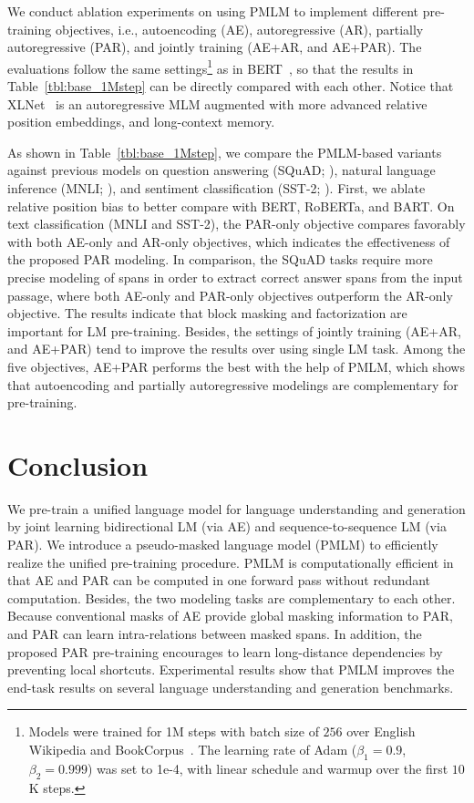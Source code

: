 \documentclass{article}
\newcommand\pmlmfull{pseudo-masked language model}
\newcommand\pmlm{\textsc{PMLM}}
\begin{document}
We conduct ablation experiments on using \pmlm{} to implement different pre-training objectives, i.e., autoencoding (AE), autoregressive (AR), partially autoregressive (PAR), and jointly training (AE+AR, and AE+PAR).
The evaluations follow the same settings\footnote{Models were trained for 1M steps with batch size of $256$ over English Wikipedia and BookCorpus~\cite{bookcorpus}. The learning rate of Adam ($\beta_1=0.9$, $\beta_2=0.999$) was set to 1e-4, with linear schedule and warmup over the first $10$K steps.} as in BERT~\cite{bert}, so that the results in Table~\ref{tbl:base_1Mstep} can be directly compared with each other.
Notice that XLNet~\cite{xlnet} is an autoregressive MLM augmented with more advanced relative position embeddings, and long-context memory.


As shown in Table~\ref{tbl:base_1Mstep}, we compare the \pmlm{}-based variants against previous models on question answering (SQuAD; \citealt{squad1,squad2}), natural language inference (MNLI; \citealt{mnli2017}), and sentiment classification (SST-2; \citealt{sst2013}).
First, we ablate relative position bias to better compare with BERT, RoBERTa, and BART.
On text classification (MNLI and SST-2), the PAR-only objective compares favorably with both AE-only and AR-only objectives, which indicates the effectiveness of the proposed PAR modeling.
In comparison, the SQuAD tasks require more precise modeling of spans in order to extract correct answer spans from the input passage, where both AE-only and PAR-only objectives outperform the AR-only objective.
The results indicate that block masking and factorization are important for LM pre-training.
Besides, the settings of jointly training (AE+AR, and AE+PAR) tend to improve the results over using single LM task.
Among the five objectives, AE+PAR performs the best with the help of \pmlm{}, which shows that autoencoding and partially autoregressive modelings are complementary for pre-training.


\section{Conclusion}

We pre-train a unified language model for language understanding and generation by joint learning bidirectional LM (via AE) and sequence-to-sequence LM (via PAR).
We introduce a \pmlmfull{} (\pmlm{}) to efficiently realize the unified pre-training procedure.
\pmlm{} is computationally efficient in that AE and PAR can be computed in one forward pass without redundant computation.
Besides, the two modeling tasks are complementary to each other.
Because conventional masks of AE provide global masking information to PAR, and PAR can learn intra-relations between masked spans.
In addition, the proposed PAR pre-training encourages to learn long-distance dependencies by preventing local shortcuts.
Experimental results show that \pmlm{} improves the end-task results on several language understanding and generation benchmarks.
\end{document}
